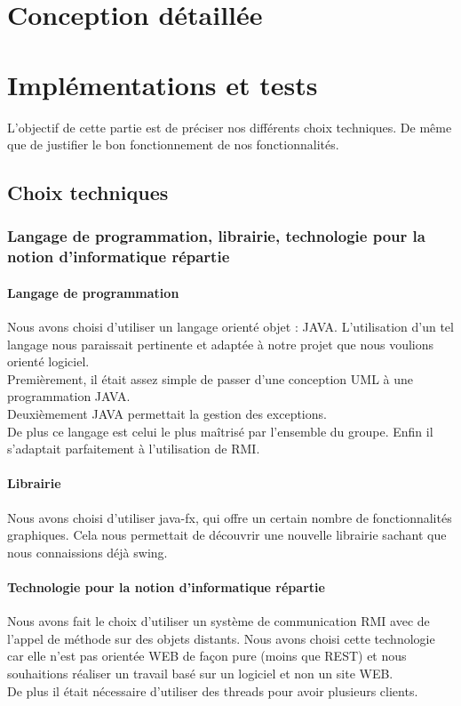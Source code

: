 \documentclass[11pt,dvipsnames,svgnames]{report}
\begin{document}
\chapter{Conception détaillée}
\chapter{Implémentations et tests}
L'objectif de cette partie est de préciser nos différents choix techniques. De même que de justifier le bon fonctionnement de nos fonctionnalités.
\section{Choix techniques}
\subsection{Langage de programmation, librairie, technologie pour la notion d'informatique répartie}
\subsubsection{Langage de programmation}
Nous avons choisi d'utiliser un langage orienté objet : JAVA. L'utilisation d'un tel langage nous paraissait pertinente et adaptée à notre projet que nous voulions orienté logiciel.\\
Premièrement, il était assez simple de passer d'une conception UML à une programmation JAVA. \\
Deuxièmement JAVA permettait la gestion des exceptions.\\
De plus ce langage est celui le plus maîtrisé par l'ensemble du groupe.
Enfin il s'adaptait parfaitement à l'utilisation de RMI.\\
\subsubsection{Librairie}
Nous avons choisi d'utiliser java-fx, qui offre un certain nombre de fonctionnalités graphiques. Cela nous permettait de découvrir une nouvelle librairie sachant que nous connaissions déjà swing.
\subsubsection{Technologie pour la notion d'informatique répartie}
Nous avons fait le choix d'utiliser un système de communication RMI avec de l'appel de méthode sur des objets distants. Nous avons choisi cette technologie car elle n'est pas orientée WEB de façon pure (moins que REST) et nous souhaitions réaliser un travail basé sur un logiciel et non un site WEB.\\
De plus il était nécessaire d'utiliser des threads pour avoir plusieurs clients. 
\end{document}
